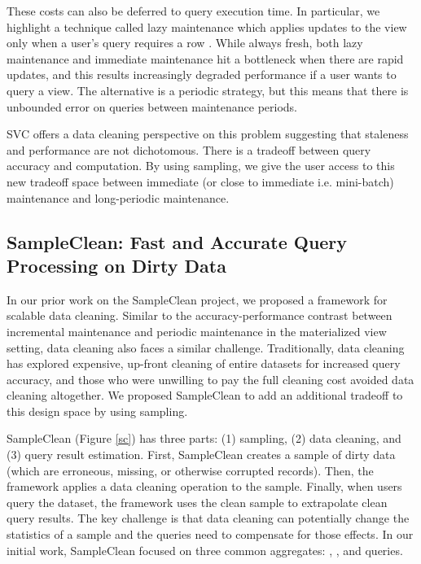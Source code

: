 These costs can also be deferred to query execution time.
In particular, we highlight a technique called lazy maintenance which applies updates to the view only when a user's query requires a row \cite{zhou2007lazy}.
While always fresh, both lazy maintenance and immediate maintenance hit a bottleneck when there are rapid updates, and this results increasingly degraded performance if a user wants to query a view.
The alternative is a periodic strategy, but this means that there is unbounded error on queries between maintenance periods.

SVC offers a data cleaning perspective on this problem suggesting that staleness and performance are not dichotomous.
There is a tradeoff between query accuracy and computation.
By using sampling, we give the user access to this new tradeoff space between immediate (or close to immediate i.e. mini-batch) maintenance and long-periodic maintenance.

\subsection{SampleClean: Fast and Accurate Query Processing on Dirty Data}
In our prior work on the SampleClean project, we proposed a framework for scalable data cleaning.
Similar to the accuracy-performance contrast between incremental maintenance and periodic maintenance in the materialized view setting, data cleaning also faces a similar challenge.
Traditionally, data cleaning has explored expensive, up-front cleaning of entire datasets for increased query accuracy, and those who were unwilling to pay the full cleaning cost avoided data cleaning altogether.
We proposed SampleClean to add an additional tradeoff to this design space by using sampling.

SampleClean (Figure \ref{sc}) has three parts: (1) sampling, (2) data cleaning, and (3) query result estimation.
First, SampleClean creates a sample of dirty data (which are erroneous, missing, or otherwise corrupted records).
Then, the framework applies a data cleaning operation to the sample.
Finally, when users query the dataset, the framework uses the clean sample to extrapolate clean query results.
The key challenge is that data cleaning can potentially change the statistics of a sample and the queries need to compensate for those effects.
In our initial work, SampleClean focused on three common aggregates: \sumfunc, \avgfunc, and \countfunc queries.

